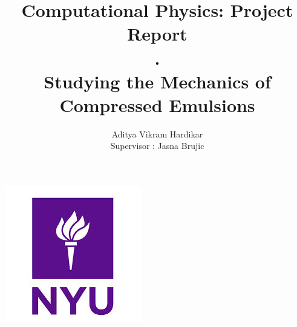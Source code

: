 \documentclass[12pt]{article}
\begin{document}
\title{Computational Physics: Project Report\\\color{white}.\color{}\\ \textbf{Studying the Mechanics of Compressed Emulsions} }
\author{Aditya Vikram Hardikar \\ Supervisor : Jasna Brujic}
\maketitle

\begin{center}
  \includegraphics[width = 0.3\linewidth]{images/nyu.jpeg}
\end{center}
\end{document}
